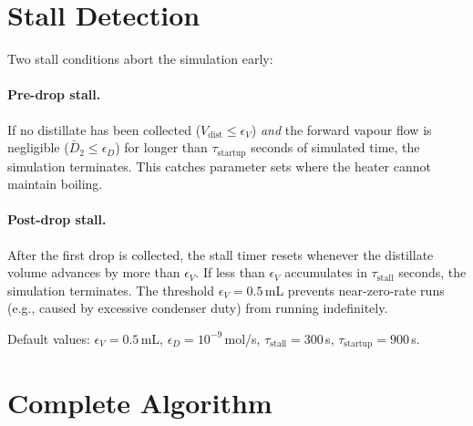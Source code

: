 \documentclass[11pt,letterpaper]{article}
\begin{document}
\section{Stall Detection}
\label{sec:stall}

Two stall conditions abort the simulation early:

\paragraph{Pre-drop stall.}
If no distillate has been collected ($V_{\mathrm{dist}} \le \epsilon_V$)
\emph{and} the forward vapour flow is negligible ($\bar{D}_2 \le \epsilon_D$)
for longer than $\tau_{\mathrm{startup}}$ seconds of simulated time, the
simulation terminates.  This catches parameter sets where the heater cannot
maintain boiling.

\paragraph{Post-drop stall.}
After the first drop is collected, the stall timer resets whenever the
distillate volume advances by more than $\epsilon_V$.  If less than $\epsilon_V$
accumulates in $\tau_{\mathrm{stall}}$ seconds, the simulation terminates.
The threshold $\epsilon_V = 0.5$\,mL prevents near-zero-rate runs (e.g.,
caused by excessive condenser duty) from running indefinitely.

Default values: $\epsilon_V = 0.5$\,mL, $\epsilon_D = 10^{-9}$\,mol/s,
$\tau_{\mathrm{stall}} = 300$\,s, $\tau_{\mathrm{startup}} = 900$\,s.

\section{Complete Algorithm}
\label{sec:algorithm}
\end{document}
